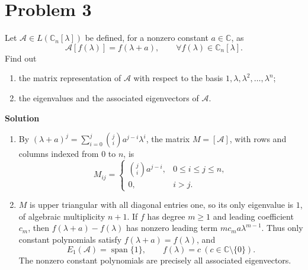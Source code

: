 \documentclass[UTF8,10pt,letterpaper,fontset=fandol]{ctexart}
\newcommand{\C}{\mathbb C}
\newcommand{\Solution}{\par\Needspace{4\baselineskip}\textbf{Solution}\par}
\begin{document}
\newpage
\section{Problem 3}
Let $\mathcal A\in L(\C_n[\lambda])$ be defined, for a nonzero constant $a\in\C$, as
\[
\mathcal A[f(\lambda)]=f(\lambda+a),\qquad\forall f(\lambda)\in\C_n[\lambda].
\]
Find out
\begin{enumerate}
\item the matrix representation of $\mathcal A$ with respect to the basis $1,\lambda,\lambda^2,\ldots,\lambda^n$;
\item the eigenvalues and the associated eigenvectors of $\mathcal A$.
\end{enumerate}
\Solution
\begin{enumerate}
\item By $(\lambda+a)^j=\sum_{i=0}^j\binom ji a^{j-i}\lambda^i$, the matrix $M=[\mathcal A]$, with rows and columns indexed from $0$ to $n$, is
\[
\boxed{M_{ij}=\begin{cases}\binom ji a^{j-i},&0\le i\le j\le n,\\0,&i>j.\end{cases}}
\]
\item $M$ is upper triangular with all diagonal entries one, so its only eigenvalue is $1$, of algebraic multiplicity $n+1$.
If $f$ has degree $m\ge1$ and leading coefficient $c_m$, then $f(\lambda+a)-f(\lambda)$ has nonzero leading term $mc_ma\lambda^{m-1}$.
Thus only constant polynomials satisfy $f(\lambda+a)=f(\lambda)$, and
\[
\boxed{E_1(\mathcal A)=\operatorname{span}\{1\},\qquad f(\lambda)=c\ (c\in\C\setminus\{0\})}.
\]
The nonzero constant polynomials are precisely all associated eigenvectors.
\end{enumerate}
\end{document}
